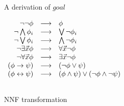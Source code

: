 \documentclass[a4paper,11pt]{article}
\begin{document}
\begin{figure}
\begin{minipage}[b]{0.5\linewidth}
\centering
{}
\caption{A derivation of $goal$}
\label{fig1}
\end{minipage}
\begin{minipage}[b]{0.5\linewidth}
\centering
\begin{math}
\begin{array}{r c l}
\lnot \lnot \phi & \longrightarrow & \phi\\
\lnot \bigwedge \phi_i & \longrightarrow & \bigvee \lnot \phi_i \\
\lnot \bigvee \phi_i & \longrightarrow & \bigwedge \lnot \phi_i \\
\lnot \exists \vec x \phi & \longrightarrow & \forall \vec x \lnot \phi\\
\lnot \forall \vec x \phi & \longrightarrow & \exists \vec x \lnot \phi\\
(\phi \to \psi) & \longrightarrow &(\lnot \phi \lor \psi)\\
(\phi \leftrightarrow \psi) & \longrightarrow 
&(\phi \land \psi) \lor (\lnot \phi \land \lnot \psi)\\\\
\end{array}
\end{math}
\caption{NNF transformation}
\label{nnf}
\end{minipage}
\end{figure}
\end{document}
